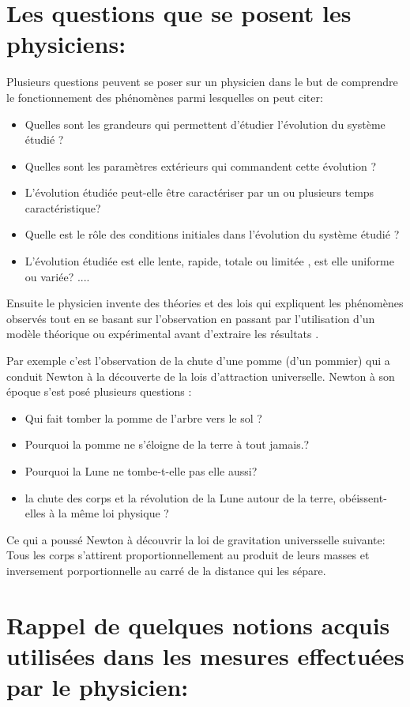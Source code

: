 \documentclass[12pt]{article}
\begin{document}
\section{Les questions que se posent les physiciens: }
Plusieurs questions peuvent se poser sur un physicien dans le but de comprendre le fonctionnement des phénomènes
parmi lesquelles on peut citer:
\begin{itemize}
   \item Quelles sont les grandeurs qui permettent d'étudier l'évolution du système étudié ?
   \item Quelles sont les paramètres extérieurs qui commandent cette évolution ?
   \item L'évolution étudiée peut-elle être caractériser par un ou plusieurs temps caractéristique?
   \item Quelle est le rôle des conditions initiales dans l'évolution du système étudié ?
   \item L'évolution étudiée est elle lente, rapide, totale ou limitée , est elle uniforme ou variée? ....

\end{itemize}

      Ensuite le physicien invente des théories et des lois qui expliquent les phénomènes observés tout en se basant sur
l'observation en passant par l'utilisation d'un modèle théorique ou expérimental avant d'extraire les résultats .

Par exemple c'est l'observation de la chute d'une pomme (d’un pommier) qui a conduit Newton à la découverte de la
lois d'attraction universelle.
Newton à son époque s’est posé plusieurs questions :
\begin{itemize}
   \item Qui fait tomber la pomme de l’arbre vers le sol ?
   \item Pourquoi la pomme ne s'éloigne de la terre à tout jamais.?
   \item Pourquoi la Lune ne tombe-t-elle pas elle aussi?
   \item la chute des corps et la révolution de la Lune autour de la terre, obéissent-elles à la même loi physique ?
      \end{itemize}
Ce qui a poussé Newton à découvrir la loi de gravitation universselle suivante:
Tous les corps s'attirent proportionnellement au produit de leurs masses et inversement porportionnelle au carré de la
distance qui les sépare.

\section{Rappel de quelques notions acquis utilisées dans les mesures effectuées par le physicien:}
\end{document}
